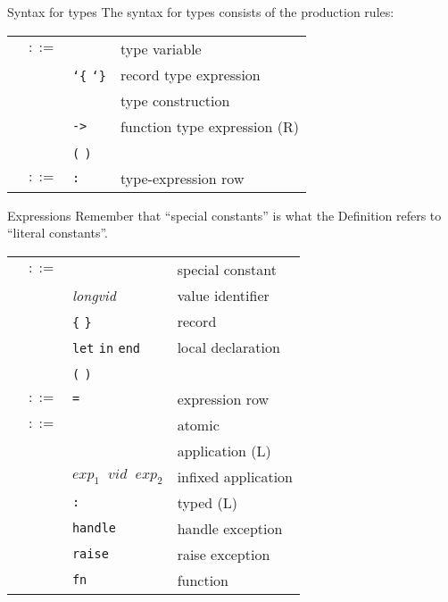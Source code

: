 \begin{grammar}{Syntax for types}
The syntax for types consists of the production rules:
\begin{longtable}{rcll}
\label{grammar:ty}\nonterminal{ty} & $::=$ & \nonterminal{tyvar} & type variable\\
& \alt & \texttt{\char`\{} \optional{\textit{tyrow}} \texttt{\char`\}} & record type expression\\
& \alt & \nonterminal{tyseq} \nonterminal{longtycon} & type construction\\
& \alt & \nonterminal{ty} \texttt{->} \nonterminal{ty\/$'$} & function type expression (R)\\
& \alt & \texttt{(} \nonterminal{ty} \texttt{)} & \\
\label{grammar:tyrow}\nonterminal{tyrow} & $::=$ & \nonterminal{lab} \texttt{:} \nonterminal{ty} \optional{\texttt{\char`,} \nonterminal{tyrow}} & type-expression row\\
\end{longtable}
\end{grammar}

\begin{grammar}{Expressions}
Remember that ``special constants'' is what the Definition refers to
``literal constants''.
\begin{longtable}{rcll}
\label{grammar:atexp}\nonterminal{atexp} & $::=$ & \nonterminal{scon} & special constant\\
& \alt& \optional{\texttt{op}} \textit{longvid} & value identifier\\
&\alt&\verb+{+ \optional{\textit{exprow}} \verb+}+ & record\\
&\alt&\texttt{let} \hyperref[grammar:dec]{\nonterminal{dec}} \texttt{in} \nonterminal{exp} \texttt{end} & local declaration\\
&\alt&\texttt{(} \nonterminal{exp} \texttt{)} & \\
\label{grammar:exprow}\nonterminal{exprow} & $::=$ & \nonterminal{lab} \texttt{=} \nonterminal{exp} \optional{\texttt{\char`\,} \nonterminal{exprow}}
& expression row\\
\label{grammar:exp}\nonterminal{exp} & $::=$ & \nonterminal{atexp} & atomic\\
&\alt& \nonterminal{exp} \nonterminal{atexp} & application (L)\\
&\alt& $exp_{1}\;\;vid\;\;exp_{2}$ & infixed application\\
&\alt& \nonterminal{exp} \texttt{:} \hyperref[grammar:ty]{\nonterminal{ty}} & typed (L)\\
&\alt& \nonterminal{exp} \texttt{handle} \hyperref[grammar:match]{\nonterminal{match}} & handle exception\\
&\alt&\texttt{raise} \nonterminal{exp} & raise exception\\
&\alt&\texttt{fn} \hyperref[grammar:match]{\nonterminal{match}} & function\\
\end{longtable}
\end{grammar}

